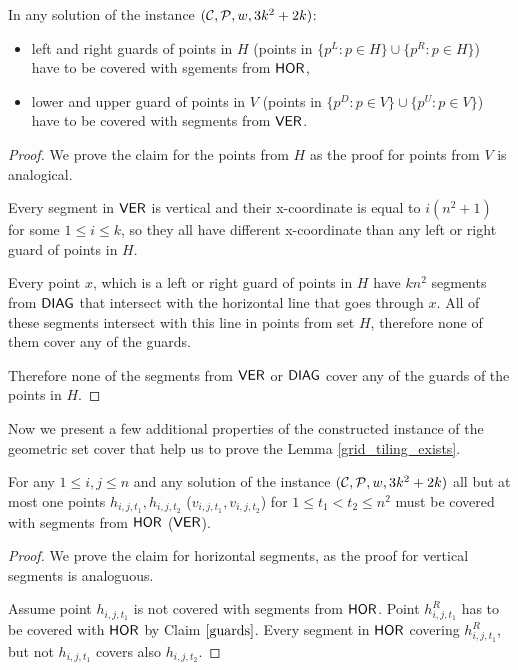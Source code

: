 \begin{claim}
\label{guards}
In any solution of the instance $(\mathcal{C}, \mathcal{P}, w, 3k^2+2k)$:
\begin{itemize}
\item left and right guards of points in $H$
(points in $\{p^L : p \in H\} \cup \{p^R : p \in H\}$)
have to be covered with sgements from $\mathsf{HOR}$,
\item lower and upper guard of points in $V$
(points in $\{p^D : p \in V\} \cup \{p^U : p \in V\}$)
have to be covered with segments from $\mathsf{VER}$.
\end{itemize}
\end{claim}

\begin{proof}
We prove the claim for the points from $H$
as the proof for points from $V$ is analogical.

Every segment in $\mathsf{VER}$ is vertical and 
their x-coordinate is equal to $i(n^2+1)$ for some $1\le i \le k$,
so they all have different x-coordinate
than any left or right guard of points in $H$.

Every point $x$, which is a left or right guard of points in $H$
have $kn^2$ segments from $\mathsf{DIAG}$ that intersect with the horizontal
line that goes through $x$. All of these segments intersect with
this line in points from set $H$, therefore none of them
cover any of the guards.

Therefore none of the segments from $\mathsf{VER}$ or $\mathsf{DIAG}$ cover any
of the guards of the points in $H$.
\end{proof}

Now we present a few additional properties of the constructed instance
of the geometric set cover that help us to prove
the Lemma \ref{grid_tiling_exists}.

\begin{claim}
\label{one_diag_in_square}
For any $1 \le i, j \le n$
and any solution of the instance $(\mathcal{C}, \mathcal{P}, w, 3k^2+2k)$
all but at most one points $h_{i, j, t_1}, h_{i, j, t_2}$
($v_{i, j, t_1}, v_{i, j, t_2}$)
for $1 \le t_1 < t_2 \le n^2$
must be
covered with segments from $\mathsf{HOR}$ ($\mathsf{VER}$).
\end{claim}

\begin{proof}
We prove the claim for horizontal segments,
as the proof for vertical segments is analoguous.

Assume point $h_{i, j, t_1}$ is not covered with
segments from $\mathsf{HOR}$.
Point $h^R_{i, j, t_1}$ has to be covered with $\mathsf{HOR}$
by Claim $\ref{guards}$.
Every segment in $\mathsf{HOR}$ covering $h^R_{i, j, t_1}$,
but not $h_{i,j,t_1}$ covers also $h_{i, j, t_2}$.
\end{proof}

